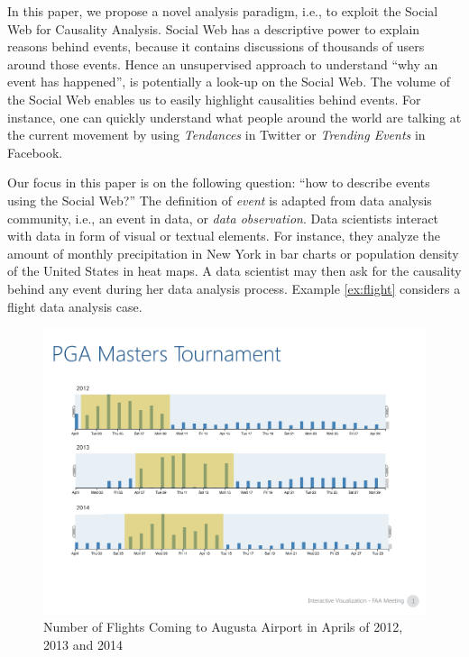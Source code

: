 \documentclass[conference]{IEEEtran}
\begin{document}
In this paper, we propose a novel analysis paradigm, i.e., to exploit the Social Web for Causality Analysis. Social Web has a descriptive power to explain reasons behind events, because it contains discussions of thousands of users around those events. Hence an unsupervised approach to understand ``why an event has happened'', is potentially a look-up on the Social Web. The volume of the Social Web enables us to easily highlight causalities behind events. For instance, one can quickly understand what people around the world are talking at the current movement by using {\em Tendances} in Twitter or {\em Trending Events} in Facebook.

Our focus in this paper is on the following question: ``how to describe events using the Social Web?'' The definition of {\em event} is adapted from data analysis community, i.e., an event in data, or {\em data observation}. Data scientists interact with data in form of visual or textual elements. For instance, they analyze the amount of monthly precipitation in New York in bar charts or population density of the United States in heat maps. A data scientist may then ask for the causality behind any event during her data analysis process. Example \ref{ex:flight} considers a flight data analysis case.

\begin{figure}[htpb]
\centerline{\includegraphics[width = .9\linewidth, keepaspectratio = true]{figs/ap12.pdf}}
\caption{\label{fig:ap12} Number of Flights Coming to Augusta Airport in Aprils of 2012, 2013 and 2014}
\end{figure}
\end{document}
